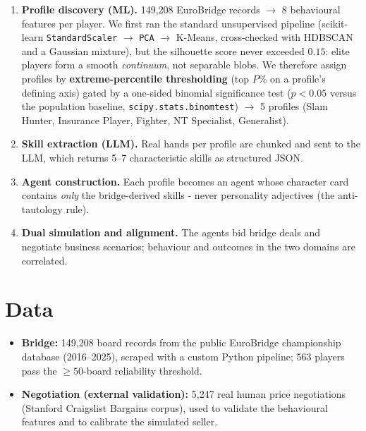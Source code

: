 \documentclass[11pt, a4paper, oneside, openany]{report}
\begin{document}
\begin{enumerate}[leftmargin=*]
  \item \textbf{Profile discovery (ML).} 149{,}208 EuroBridge records
        $\rightarrow$ 8 behavioural features per player. We first ran the
        standard unsupervised pipeline (scikit-learn
        \texttt{StandardScaler} $\rightarrow$ \texttt{PCA} $\rightarrow$
        K-Means, cross-checked with HDBSCAN and a Gaussian mixture),
        but the silhouette score never exceeded $0.15$: elite players form
        a smooth \emph{continuum}, not separable blobs. We therefore assign
        profiles by \textbf{extreme-percentile thresholding} (top $P\%$ on a
        profile's defining axis) gated by a one-sided binomial significance
        test ($p<0.05$ versus the population baseline, \texttt{scipy.stats.\allowbreak binomtest})
        $\rightarrow$ 5 profiles (Slam Hunter, Insurance Player, Fighter,
        NT Specialist, Generalist).
  \item \textbf{Skill extraction (LLM).} Real hands per profile are chunked
        and sent to the LLM, which returns 5--7 characteristic skills as
        structured JSON.
  \item \textbf{Agent construction.} Each profile becomes an agent whose
        character card contains \emph{only} the bridge-derived skills - 
        never personality adjectives (the anti-tautology rule).
  \item \textbf{Dual simulation and alignment.} The agents bid bridge deals
        and negotiate business scenarios; behaviour and outcomes in the two
        domains are correlated.
\end{enumerate}

\section{Data}
\begin{itemize}[leftmargin=*]
  \item \textbf{Bridge:} 149{,}208 board records from the public EuroBridge
        championship database (2016--2025), scraped with a custom Python
        pipeline; 563 players pass the $\geq 50$-board reliability threshold.
  \item \textbf{Negotiation (external validation):} 5{,}247 real human
        price negotiations (Stanford Craigslist Bargains corpus), used to
        validate the behavioural features and to calibrate the simulated
        seller.
\end{itemize}
\end{document}
